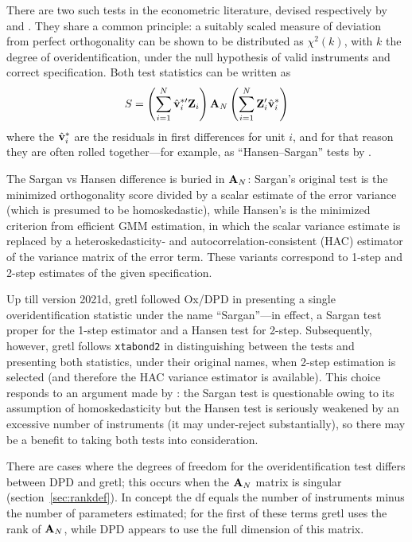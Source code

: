 There are two such tests in the econometric literature, devised
respectively by \cite{sargan58} and \cite{hansen82}. They share a
common principle: a suitably scaled measure of deviation from perfect
orthogonality can be shown to be distributed as $\chi^2(k)$, with $k$
the degree of overidentification, under the null hypothesis of valid
instruments and correct specification. Both test statistics can be
written as
\[
  S = \left(\sum_{i=1}^N \hat{\mathbf{v}}^{*\prime}_i \mathbf{Z}_i\right)  
   \mathbf{A}_N \left(\sum_{i=1}^N \mathbf{Z}_i' \hat{\mathbf{v}}^*_i\right)
\]
where the $\hat{\mathbf{v}}^*_i$ are the residuals in first differences for
unit $i$, and for that reason they are often rolled together---for
example, as ``Hansen--Sargan'' tests by \cite{davidson-mackinnon04}.

The Sargan vs Hansen difference is buried in $\mathbf{A}_N$: Sargan's
original test is the minimized orthogonality score divided by a scalar
estimate of the error variance (which is presumed to be
homoskedastic), while Hansen's is the minimized criterion from
efficient GMM estimation, in which the scalar variance estimate is
replaced by a heteroskedasticity- and autocorrelation-consistent (HAC)
estimator of the variance matrix of the error term. These variants
correspond to 1-step and 2-step estimates of the given specification.

Up till version 2021d, gretl followed Ox/DPD in presenting a single
overidentification statistic under the name ``Sargan''---in effect, a
Sargan test proper for the 1-step estimator and a Hansen test for
2-step. Subsequently, however, gretl follows \texttt{xtabond2} in
distinguishing between the tests and presenting both statistics, under
their original names, when 2-step estimation is selected (and
therefore the HAC variance estimator is available). This choice
responds to an argument made by \cite{Roodman2009a}: the Sargan test
is questionable owing to its assumption of homoskedasticity but the
Hansen test is seriously weakened by an excessive number of
instruments (it may under-reject substantially), so there may be a
benefit to taking both tests into consideration.

There are cases where the degrees of freedom for the
overidentification test differs between DPD and gretl; this occurs
when the $\mathbf{A}_N$ matrix is singular (section~\ref{sec:rankdef}). In
concept the df equals the number of instruments minus the number of
parameters estimated; for the first of these terms gretl uses the rank
of $\mathbf{A}_N$, while DPD appears to use the full dimension of this
matrix.

